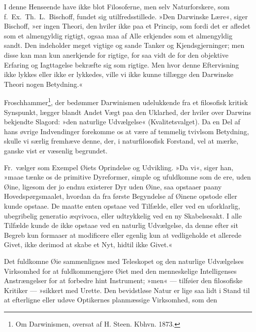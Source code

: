 \documentclass[12pt,a4paper]{article}
\begin{document}
I denne Henseende have ikke blot Filosoferne, men selv Naturforskere,
som f.\ Ex.\ Th.\ L.\ Bischoff, fundet sig utilfredsstillede. »Den
Darwinske Lære«, siger Bischoff, »er ingen Theori, den hviler ikke paa
et Princip, som fordi det er afledet som et almengyldig rigtigt, ogsaa
maa af Alle erkjendes som et almengyldig sandt. Den indeholder meget
vigtige og sande Tanker og Kjendsgjerninger; men disse kan man kun
anerkjende for rigtige, for saa vidt de for den objektive Erfaring og
Iagttagelse bekræfte sig som rigtige. Men hvor denne Eftervisning ikke
lykkes eller ikke er lykkedes, ville vi ikke kunne tillægge den
Darwinske Theori nogen Betydning.«


\medskip

\noindent Froschhammer\footnote{Om Darwinismen, oversat af H. Steen.
Kbhvn. 1873.}, der bedømmer Darwinismen udelukkende fra et filosofisk
kritisk Synspunkt, lægger blandt Andet Vægt paa den Uklarhed, der
hviler over Darwins bekjendte Slagord: »den naturlige Udvælgelse«
(Kvalitetsvalget). Da en Del af hans øvrige Indvendinger forekomme os
at være af temmelig tvivlsom Betydning, skulle vi særlig fremhæve
denne, der, i naturfilosofisk Forstand, vel at mærke, ganske vist er
væsenlig begrundet.

Fr.\ vælger som Exempel Øiets Oprindelse og Udvikling. »Da vi«, siger
han, »maae tænke os de primitive Dyreformer, simple og ufuldkomne som
de ere, uden Øine, ligesom der jo endnu existerer Dyr uden Øine, saa
opstaaer paany Hovedspørgsmaalet, hvordan da fra første Begyndelse af
Øinene opstode eller kunde opstaae. De maatte enten opstaae ved
Tilfælde, eller ved en uforklarlig, ubegribelig generatio æqvivoca,
eller udtrykkelig ved en ny Skabelsesakt. I alle Tilfælde kunde de
ikke opstaae ved en naturlig Udvælgelse, da denne efter sit Begreb kun
formaaer at modificere eller egenlig kun at vedligeholde et allerede
Givet, ikke derimod at skabe et Nyt, hidtil ikke Givet.«

Det fuldkomne Øie sammenlignes med Teleskopet og den naturlige
Udvælgelses Virksomhed for at fuldkommengjøre Øiet med den menneskelige
Intelligenses Anstrængelser for at forbedre hint Instrument; »men« ---
tilføier den filosofiske Kritiker --- »sikkert med Urette. Den bevidstløse
Natur er lige saa lidt i Stand til at efterligne eller udøve Optikernes
planmæssige Virksomhed, som den

\end{document}
